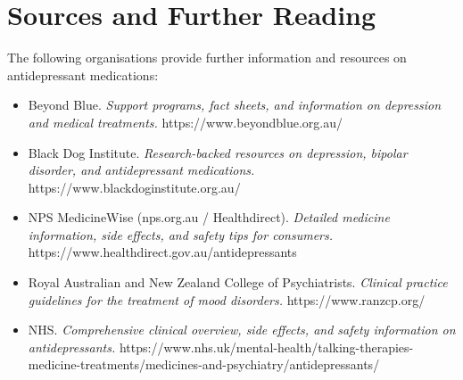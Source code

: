 \section*{Sources and Further Reading}
The following organisations provide further information and resources on antidepressant medications:
\begin{itemize}
    \item Beyond Blue. \textit{Support programs, fact sheets, and information on depression and medical treatments.} https://www.beyondblue.org.au/
    \item Black Dog Institute. \textit{Research-backed resources on depression, bipolar disorder, and antidepressant medications.} https://www.blackdoginstitute.org.au/
    \item NPS MedicineWise (nps.org.au / Healthdirect). \textit{Detailed medicine information, side effects, and safety tips for consumers.} https://www.healthdirect.gov.au/antidepressants
    \item Royal Australian and New Zealand College of Psychiatrists. \textit{Clinical practice guidelines for the treatment of mood disorders.} https://www.ranzcp.org/
    \item NHS. \textit{Comprehensive clinical overview, side effects, and safety information on antidepressants.} https://www.nhs.uk/mental-health/talking-therapies-medicine-treatments/medicines-and-psychiatry/antidepressants/
\end{itemize}
